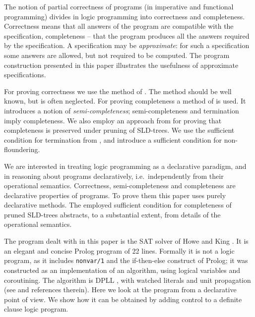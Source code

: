 \documentclass{tlp}
\begin{document}
 

The notion of partial correctness of programs
(in imperative and functional programming) 
divides in logic programming into correctness and completeness.
Correctness means that all answers of the program are compatible with the specification,
completeness -- that the program  produces all the answers required by the
specification. 
A specification may be {\em approximate}\/:
 for such a specification
some answers are allowed, but not required to be computed.
The program construction presented in this paper illustrates 
the usefulness of approximate specifications.


For proving correctness we use the method of \cite {Clark79}.
The method should be well known, but is often neglected.
For proving completeness a method of \cite{drabent.tocl16}
is used.  It introduces a notion of {\em semi-completeness}\/;
semi-completeness and termination imply completeness.
We also employ an approach from \cite{drabent.tocl16} 
for proving that completeness is preserved under pruning of SLD-trees.
We use the sufficient condition for termination
from \cite{DBLP:journals/jlp/Bezem93},
and introduce a sufficient condition for non-floundering.


 We are interested in treating logic programming as a declarative paradigm,
 and in reasoning about programs declaratively, i.e.\ 
 independently from their operational semantics.
 Correctness, semi-completeness and completeness are declarative properties
 of programs.
To prove them this paper uses purely declarative methods.
The employed sufficient condition for completeness of pruned SLD-trees
 abstracts, to a substantial extent, from details of the operational semantics.





The program dealt with in this paper is the SAT solver of 
Howe and King \citeyear{howe.king.tcs-shorter}.
It is an elegant and
concise Prolog program of 22 lines.  Formally it is not a logic program, as it includes
{\tt non{}var/1} and the if-then-else construct of Prolog;
it was constructed as an
implementation of an algorithm, using logical variables and
coroutining.  The algorithm is
DPLL
\cite{DBLP:journals/cacm/DavisLL62},
 with watched literals and unit propagation 
(see \cite{handbook-SATsolvers,howe.king.tcs-shorter} and references therein). 
Here we look at the program from
a declarative point of view.
We show how it
can be obtained by adding control to a definite clause logic program.
\end{document}
